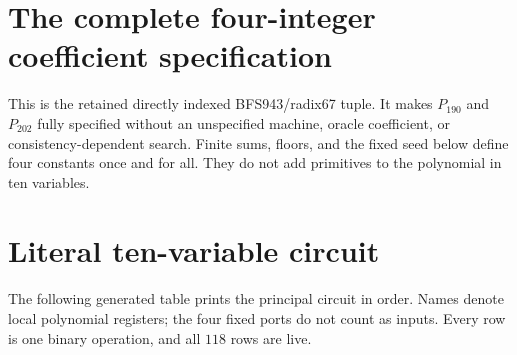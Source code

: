 \documentclass[11pt]{article}
\theoremstyle{remark}
\begin{document}
\appendix
\section{The complete four-integer coefficient specification}\label{app:constants}
This is the retained directly indexed BFS943/radix67 tuple.
It makes \(P_{190}\) and \(P_{202}\) fully specified without an unspecified
machine, oracle coefficient, or consistency-dependent search.
Finite sums, floors, and the fixed seed below define four constants once
and for all. They do not add primitives to the polynomial in ten variables.


\section{Literal ten-variable circuit}
The following generated table prints the principal circuit in order.
Names denote local polynomial registers; the four fixed ports do not count
as inputs. Every row is one binary operation, and all \(118\) rows are live.



\end{document}
